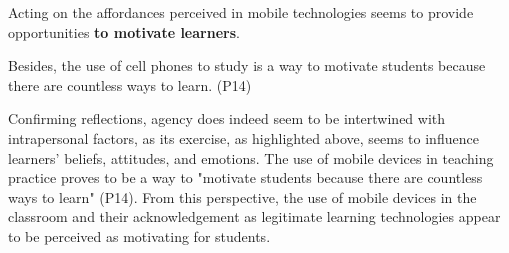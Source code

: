 Acting on the affordances perceived in mobile technologies seems to
provide opportunities \textbf{to motivate learners}.


Besides, the use of cell phones to study is a way to motivate students
because there are countless ways to learn. (P14)

Confirming  reflections, agency does
indeed seem to be intertwined with intrapersonal factors, as its
exercise, as highlighted above, seems to influence
learners' beliefs, attitudes, and emotions. The use of
mobile devices in teaching practice proves to be a way to "motivate
students because there are countless ways to learn" (P14). From this
perspective, the use of mobile devices in the classroom and their
acknowledgement as legitimate learning technologies appear to be
perceived as motivating for students.

